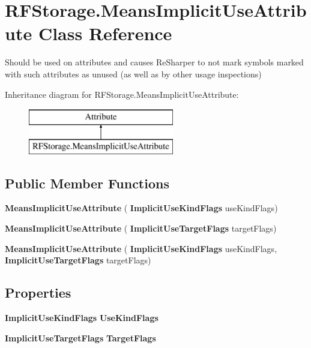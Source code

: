 \section{R\+F\+Storage.\+Means\+Implicit\+Use\+Attribute Class Reference}
\label{class_r_f_storage_1_1_means_implicit_use_attribute}


Should be used on attributes and causes Re\+Sharper to not mark symbols marked with such attributes as unused (as well as by other usage inspections)  


Inheritance diagram for R\+F\+Storage.\+Means\+Implicit\+Use\+Attribute\+:\begin{figure}[H]
\begin{center}
\leavevmode
\includegraphics[height=2.000000cm]{class_r_f_storage_1_1_means_implicit_use_attribute}
\end{center}
\end{figure}
\subsection*{Public Member Functions}
\begin{DoxyCompactItemize}
\item 
\mbox{\label{class_r_f_storage_1_1_means_implicit_use_attribute_a56697a8c2b8c4ea67b453bc051a20976}} 
{\bfseries Means\+Implicit\+Use\+Attribute} (\textbf{ Implicit\+Use\+Kind\+Flags} use\+Kind\+Flags)
\item 
\mbox{\label{class_r_f_storage_1_1_means_implicit_use_attribute_a1e4ce56a963b1da6864b3595c11c9743}} 
{\bfseries Means\+Implicit\+Use\+Attribute} (\textbf{ Implicit\+Use\+Target\+Flags} target\+Flags)
\item 
\mbox{\label{class_r_f_storage_1_1_means_implicit_use_attribute_a2147079ad27dcb23ef57eb85984fd5b8}} 
{\bfseries Means\+Implicit\+Use\+Attribute} (\textbf{ Implicit\+Use\+Kind\+Flags} use\+Kind\+Flags, \textbf{ Implicit\+Use\+Target\+Flags} target\+Flags)
\end{DoxyCompactItemize}
\subsection*{Properties}
\begin{DoxyCompactItemize}
\item 
\mbox{\label{class_r_f_storage_1_1_means_implicit_use_attribute_af99f50e57dbf3cf8a9557fae7f397eef}} 
\textbf{ Implicit\+Use\+Kind\+Flags} {\bfseries Use\+Kind\+Flags}\hspace{0.3cm}{\ttfamily  [get]}
\item 
\mbox{\label{class_r_f_storage_1_1_means_implicit_use_attribute_a6999fc2115bfeefa8b9d0a3aa321c6d3}} 
\textbf{ Implicit\+Use\+Target\+Flags} {\bfseries Target\+Flags}\hspace{0.3cm}{\ttfamily  [get]}
\end{DoxyCompactItemize}


